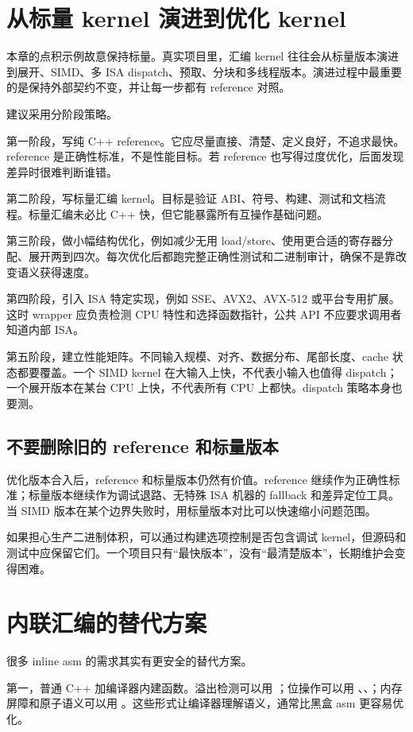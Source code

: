\section{从标量 kernel 演进到优化 kernel}

本章的点积示例故意保持标量。真实项目里，汇编 kernel 往往会从标量版本演进到展开、SIMD、多 ISA dispatch、预取、分块和多线程版本。演进过程中最重要的是保持外部契约不变，并让每一步都有 reference 对照。

建议采用分阶段策略。

第一阶段，写纯 C++ reference。它应尽量直接、清楚、定义良好，不追求最快。reference 是正确性标准，不是性能目标。若 reference 也写得过度优化，后面发现差异时很难判断谁错。

第二阶段，写标量汇编 kernel。目标是验证 ABI、符号、构建、测试和文档流程。标量汇编未必比 C++ 快，但它能暴露所有互操作基础问题。

第三阶段，做小幅结构优化，例如减少无用 load/store、使用更合适的寄存器分配、展开两到四次。每次优化后都跑完整正确性测试和二进制审计，确保不是靠改变语义获得速度。

第四阶段，引入 ISA 特定实现，例如 SSE、AVX2、AVX-512 或平台专用扩展。这时 wrapper 应负责检测 CPU 特性和选择函数指针，公共 API 不应要求调用者知道内部 ISA。

第五阶段，建立性能矩阵。不同输入规模、对齐、数据分布、尾部长度、cache 状态都要覆盖。一个 SIMD kernel 在大输入上快，不代表小输入也值得 dispatch；一个展开版本在某台 CPU 上快，不代表所有 CPU 上都快。dispatch 策略本身也要测。

\subsection{不要删除旧的 reference 和标量版本}

优化版本合入后，reference 和标量版本仍然有价值。reference 继续作为正确性标准；标量版本继续作为调试退路、无特殊 ISA 机器的 fallback 和差异定位工具。当 SIMD 版本在某个边界失败时，用标量版本对比可以快速缩小问题范围。

如果担心生产二进制体积，可以通过构建选项控制是否包含调试 kernel，但源码和测试中应保留它们。一个项目只有“最快版本”，没有“最清楚版本”，长期维护会变得困难。

\section{内联汇编的替代方案}

很多 inline asm 的需求其实有更安全的替代方案。

第一，普通 C++ 加编译器内建函数。溢出检测可以用 ；位操作可以用 、、；内存屏障和原子语义可以用 。这些形式让编译器理解语义，通常比黑盒 asm 更容易优化。

